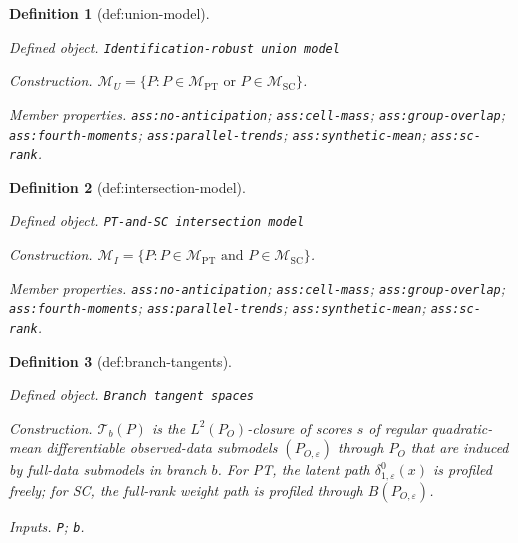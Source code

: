 \documentclass{article}
\newtheorem{definition}{Definition}
\begin{document}
\begin{definition}[def:union-model]\label{def:union-model}
\par\smallskip\noindent\emph{Defined object.} \texttt{Identification-\allowbreak{}robust union model}
\par\smallskip\noindent\emph{Construction.} \(\mathcal M_U=\{P:P\in\mathcal M_{\mathrm{PT}}\text{ or }P\in\mathcal M_{\mathrm{SC}}\}\).
\par\smallskip\noindent\emph{Member properties.} \texttt{ass:\allowbreak{}no-\allowbreak{}anticipation}; \texttt{ass:\allowbreak{}cell-\allowbreak{}mass}; \texttt{ass:\allowbreak{}group-\allowbreak{}overlap}; \texttt{ass:\allowbreak{}fourth-\allowbreak{}moments}; \texttt{ass:\allowbreak{}parallel-\allowbreak{}trends}; \texttt{ass:\allowbreak{}synthetic-\allowbreak{}mean}; \texttt{ass:\allowbreak{}sc-\allowbreak{}rank}.
\end{definition}

\begin{definition}[def:intersection-model]\label{def:intersection-model}
\par\smallskip\noindent\emph{Defined object.} \texttt{PT-\allowbreak{}and-\allowbreak{}SC intersection model}
\par\smallskip\noindent\emph{Construction.} \(\mathcal M_I=\{P:P\in\mathcal M_{\mathrm{PT}}\text{ and }P\in\mathcal M_{\mathrm{SC}}\}\).
\par\smallskip\noindent\emph{Member properties.} \texttt{ass:\allowbreak{}no-\allowbreak{}anticipation}; \texttt{ass:\allowbreak{}cell-\allowbreak{}mass}; \texttt{ass:\allowbreak{}group-\allowbreak{}overlap}; \texttt{ass:\allowbreak{}fourth-\allowbreak{}moments}; \texttt{ass:\allowbreak{}parallel-\allowbreak{}trends}; \texttt{ass:\allowbreak{}synthetic-\allowbreak{}mean}; \texttt{ass:\allowbreak{}sc-\allowbreak{}rank}.
\end{definition}

\begin{definition}[def:branch-tangents]\label{def:branch-tangents}
\par\smallskip\noindent\emph{Defined object.} \texttt{Branch tangent spaces}
\par\smallskip\noindent\emph{Construction.} \(\mathcal T_b(P)\) is the \(L^2(P_O)\)-closure of scores \(s\) of regular quadratic-mean differentiable observed-data submodels \((P_{O,\varepsilon})\) through \(P_O\) that are induced by full-data submodels in branch \(b\). For PT, the latent path \(\delta_{1,\varepsilon}^0(x)\) is profiled freely; for SC, the full-rank weight path is profiled through \(B(P_{O,\varepsilon})\).
\par\smallskip\noindent\emph{Inputs.} \texttt{P}; \texttt{b}.
\end{definition}
\end{document}
